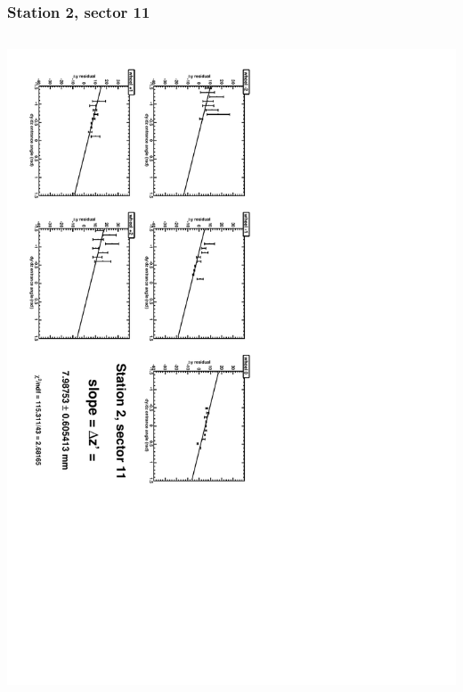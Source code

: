 \documentclass[compress]{beamer}
\begin{document}
\begin{frame}
\frametitle{Station 2, sector 11}
\begin{columns}
\includegraphics[height=\linewidth, angle=90]{zfits/zfit_2_11.pdf}


\end{columns}
\end{frame}
\end{document}
